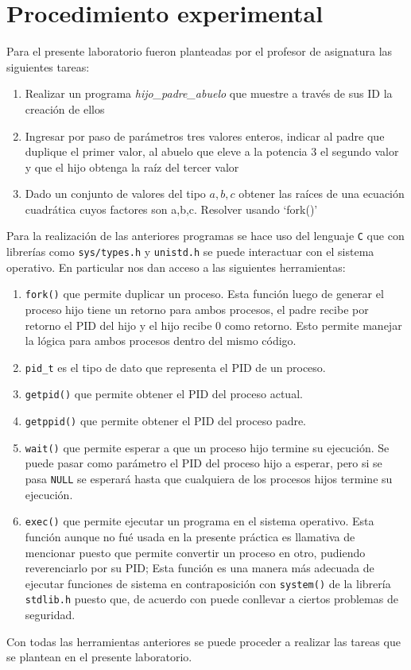 \section{Procedimiento experimental}
Para el presente laboratorio fueron planteadas por el profesor de asignatura las siguientes tareas:
\begin{enumerate}
    \item Realizar un programa \textit{hijo\_padre\_abuelo} que muestre a través de sus ID la creación de ellos
    \item Ingresar por paso de parámetros tres valores enteros, indicar al padre que duplique el primer valor, al abuelo que eleve  a la potencia $3$ el segundo valor y que el hijo obtenga la raíz del tercer valor
    \item Dado un conjunto de valores del tipo ${a,b,c}$ obtener las raíces de una ecuación cuadrática cuyos factores son a,b,c. Resolver usando `fork()'
\end{enumerate}

Para la realización de las anteriores programas se hace uso del lenguaje \verb|C| que con librerías como \verb|sys/types.h| y \verb|unistd.h| se puede interactuar con el sistema operativo. En particular nos dan acceso a las siguientes herramientas:
\begin{enumerate}
    \item \verb|fork()| que permite duplicar un proceso.
    Esta función luego de generar el proceso hijo tiene un retorno para ambos procesos, el padre recibe por retorno el PID del hijo y el hijo recibe $0$ como retorno. Esto permite manejar la lógica para ambos procesos dentro del mismo código.
    \item \verb|pid_t| es el tipo de dato que representa el PID de un proceso.
    \item \verb|getpid()| que permite obtener el PID del proceso actual.
    \item \verb|getppid()| que permite obtener el PID del proceso padre.
    \item \verb|wait()| que permite esperar a que un proceso hijo termine su ejecución.
    Se puede pasar como parámetro el PID del proceso hijo a esperar, pero si se pasa \verb|NULL| se esperará hasta que cualquiera de los procesos hijos termine su ejecución.
    \item \verb|exec()| que permite ejecutar un programa en el sistema operativo.
    Esta función aunque no fué usada en la presente práctica es llamativa de mencionar puesto que permite convertir un proceso en otro, pudiendo reverenciarlo por su PID; Esta función es una manera más adecuada de ejecutar funciones de sistema en contraposición con \verb|system()| de la librería \verb|stdlib.h| puesto que, de acuerdo con \textcite{tanenbaum1997sistemas} puede conllevar a ciertos problemas de seguridad.
\end{enumerate}

Con todas las herramientas anteriores se puede proceder a realizar las tareas que se plantean en el presente laboratorio.